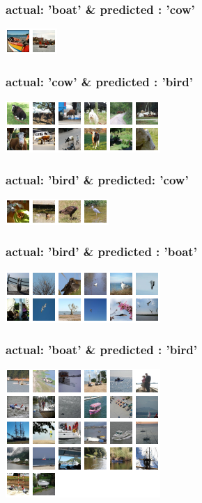 \documentclass[fleqn]{article}
\begin{document}
\subsubsection{actual: 'boat' \& predicted : 'cow'}
\includegraphics[scale=1.5]{./pics/miscallssify_boat_to_cow.png}\\

\subsubsection{actual: 'cow' \& predicted : 'bird'}
\includegraphics[scale=1.5]{./pics/miscallssify_cow_to_bird.png}\\

\subsubsection{actual: 'bird' \& predicted: 'cow'}
\includegraphics[scale=1.5]{./pics/miscallssify_bird_to_cow.png}\\

\subsubsection{actual: 'bird' \& predicted : 'boat'}
\includegraphics[scale=1.5]{./pics/miscallssify_bird_to_boat.png}\\

\subsubsection{actual: 'boat' \& predicted : 'bird'}
\includegraphics[scale=1.5]{./pics/miscallssify_boat_to_bird.png}
\end{document}
